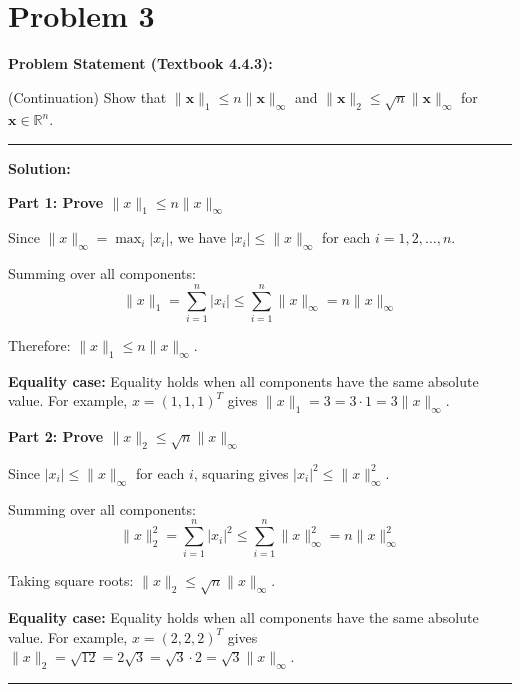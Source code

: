 \clearpage
\section*{Problem 3}

\textbf{Problem Statement (Textbook 4.4.3):} 

(Continuation) Show that $\|\mathbf{x}\|_1 \leq n\|\mathbf{x}\|_\infty$ and $\|\mathbf{x}\|_2 \leq \sqrt{n}\|\mathbf{x}\|_\infty$ for $\mathbf{x} \in \mathbb{R}^n$.

\noindent\rule{\textwidth}{0.4pt}

\vspace{1em}

\textbf{Solution:}

\textbf{Part 1: Prove $\|x\|_1 \leq n\|x\|_\infty$}

Since $\|x\|_\infty = \max_i |x_i|$, we have $|x_i| \leq \|x\|_\infty$ for each $i = 1, 2, \ldots, n$.

Summing over all components:
$$\|x\|_1 = \sum_{i=1}^n |x_i| \leq \sum_{i=1}^n \|x\|_\infty = n\|x\|_\infty$$

Therefore: $\boxed{\|x\|_1 \leq n\|x\|_\infty}$.

\textbf{Equality case:} Equality holds when all components have the same absolute value. For example, $x = (1, 1, 1)^T$ gives $\|x\|_1 = 3 = 3 \cdot 1 = 3\|x\|_\infty$.

\vspace{0.5em}

\textbf{Part 2: Prove $\|x\|_2 \leq \sqrt{n}\|x\|_\infty$}

Since $|x_i| \leq \|x\|_\infty$ for each $i$, squaring gives $|x_i|^2 \leq \|x\|_\infty^2$.

Summing over all components:
$$\|x\|_2^2 = \sum_{i=1}^n |x_i|^2 \leq \sum_{i=1}^n \|x\|_\infty^2 = n\|x\|_\infty^2$$

Taking square roots: $\boxed{\|x\|_2 \leq \sqrt{n}\|x\|_\infty}$.

\textbf{Equality case:} Equality holds when all components have the same absolute value. For example, $x = (2, 2, 2)^T$ gives $\|x\|_2 = \sqrt{12} = 2\sqrt{3} = \sqrt{3} \cdot 2 = \sqrt{3}\|x\|_\infty$.

\vspace{2em}
\noindent\rule{\textwidth}{0.4pt}
